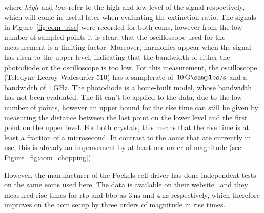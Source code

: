 where $high$ and $low$ refer to the high and low level of the signal respectively, which will come in useful later when evaluating the extinction ratio. The signals in Figure~\ref{fig:eom_rise} were recorded for both \acp{eom}, however from the low number of sampled points it is clear, that the oscilloscope used for the measurement is a limiting factor. Moreover, harmonics appear when the signal has risen to the upper level, indicating that the bandwidth of either the photodiode or the oscilloscope is too low. For this measurement, the oscilloscope (Teledyne Lecroy Wafesurfer 510) has a samplerate of $\SI{10}{\giga\samples\per\second}$ and a bandwidth of $\SI{1}{\giga\hertz}$. The photodiode is a home-built model, whose bandwidth has not been evaluated. The fit can't be applied to the data, due to the low number of points, however an upper bound for the rise time can still be given by measuring the distance between the last point on the lower level and the first point on the upper level. For both crystals, this means that the rise time is at least a fraction of a microsecond. In contrast to the \acp{aom} that are currently in use, this is already an improvement by at least one order of magnitude (see Figure~\ref{fig:aom_chopping}).

However, the manufacturer of the Pockels cell driver has done independent tests on the same \acp{eom} used here. The data is available on their website~\cite{Bergmann2020} and they measured rise times for \ac{rtp} and \ac{bbo} as $\SI{3}{\nano\second}$ and $\SI{4}{\nano\second}$ respectively, which therefore improves on the \ac{aom} setup by three orders of magnitude in rise times.

\begin{figure}[t]%
\end{figure}

